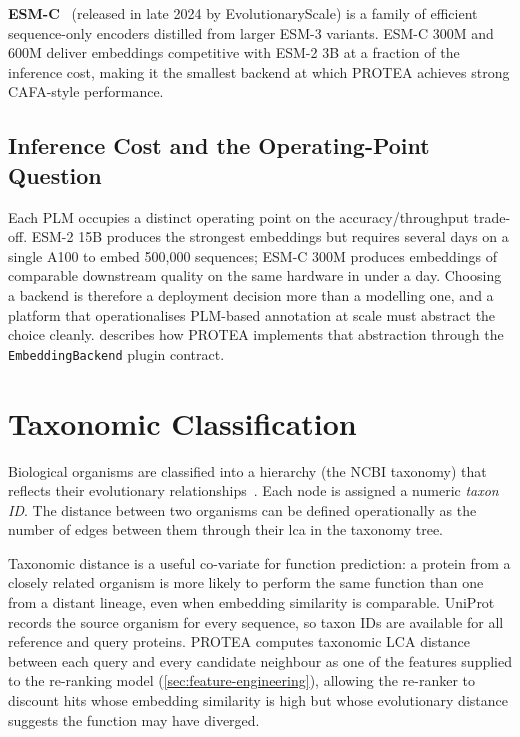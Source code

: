 \textbf{ESM-C}~\cite{esm2024esmc} (released in late 2024 by EvolutionaryScale)
is a family of efficient sequence-only encoders distilled from larger ESM-3
variants. ESM-C 300M and 600M deliver embeddings competitive with ESM-2 3B at
a fraction of the inference cost, making it the smallest backend at which
PROTEA achieves strong CAFA-style performance.

\subsection{Inference Cost and the Operating-Point Question}
\label{subsec:plm-cost}

Each PLM occupies a distinct operating point on the accuracy/throughput
trade-off. ESM-2 15B produces the strongest embeddings but requires several
days on a single A100 to embed 500,000 sequences; ESM-C 300M produces
embeddings of comparable downstream quality on the same hardware in under a
day. Choosing a backend is therefore a deployment decision more than a
modelling one, and a platform that operationalises PLM-based annotation at
scale must abstract the choice cleanly.  describes how
PROTEA implements that abstraction through the \texttt{EmbeddingBackend}
plugin contract.

\section{Taxonomic Classification}
\label{sec:taxonomy}

Biological organisms are classified into a hierarchy (the NCBI taxonomy) that
reflects their evolutionary relationships~\cite{schoch2020ncbi}. Each node is
assigned a numeric \textit{taxon ID}. The distance between two organisms can be
defined operationally as the number of edges between them through their
\gls{lca} in the taxonomy tree.

Taxonomic distance is a useful co-variate for function prediction: a protein from
a closely related organism is more likely to perform the same function than one
from a distant lineage, even when embedding similarity is comparable. UniProt
records the source organism for every sequence, so taxon IDs are available for
all reference and query proteins. PROTEA computes taxonomic LCA distance between
each query and every candidate neighbour as one of the features supplied to the
re-ranking model (\cref{sec:feature-engineering}), allowing the re-ranker to
discount hits whose embedding similarity is high but whose evolutionary distance
suggests the function may have diverged.

